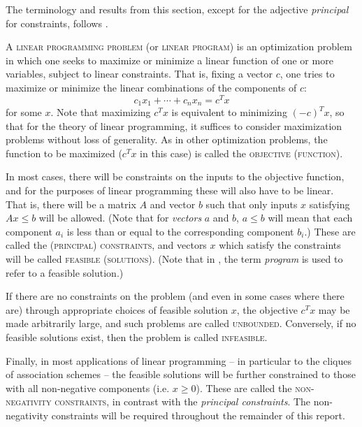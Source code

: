 \documentclass{report}
\begin{document}
    The terminology and results from this section,
    except for the adjective \textit{principal} for
    constraints, follows \cite{matousek}.

    A \textsc{linear programming problem} (or \textsc{linear program})
    is an optimization problem in which one seeks to maximize or minimize
    a linear function of one or more variables, subject to linear constraints.
    That is, fixing a vector $c$, one tries to maximize or minimize
    the linear combinations of the components of $c$:
    $$
      c_1 x_1 + \cdots + c_n x_n = c^T x
    $$
    for some $x$.
    Note that maximizing $c^T x$ is equivalent to minimizing $(-c)^T x$,
    so that for the theory of linear programming,
    it suffices to consider maximization problems without loss of generality.
    As in other optimization problems,
    the function to be maximized ($c^T x$ in this case)
    is called the \textsc{objective (function)}.

    In most cases, there will be constraints on the inputs to the objective
    function, and for the purposes of linear programming these will also have
    to be linear.
    That is, there will be a matrix $A$ and vector $b$
    such that only inputs $x$ satisfying $Ax \leq b$ will be allowed.
    (Note that for \textit{vectors} $a$ and $b$,
    $a \leq b$ will mean that each component $a_i$
    is less than or equal to the corresponding component $b_i$.)
    These are called the \textsc{(principal) constraints},
    and vectors $x$ which satisfy the constraints will be called
    \textsc{feasible (solutions)}.
    (Note that in \cite{delsarte}, the term \textit{program}
    is used to refer to a feasible solution.)

    If there are no constraints on the problem
    (and even in some cases where there are)
    through appropriate choices of feasible solution $x$,
    the objective $c^Tx$ may be made arbitrarily large,
    and such problems are called \textsc{unbounded}.
    Conversely, if no feasible solutions exist,
    then the problem is called \textsc{infeasible}.

    Finally, in most applications of linear programming --
    in particular to the cliques of association schemes --
    the feasible solutions will be further constrained
    to those with all non-negative components (i.e. $x \geq 0$).
    These are called the \textsc{non-negativity constraints},
    in contrast with the \textit{principal constraints}.
    The non-negativity constraints will be required throughout the remainder of
    this report.
\end{document}
